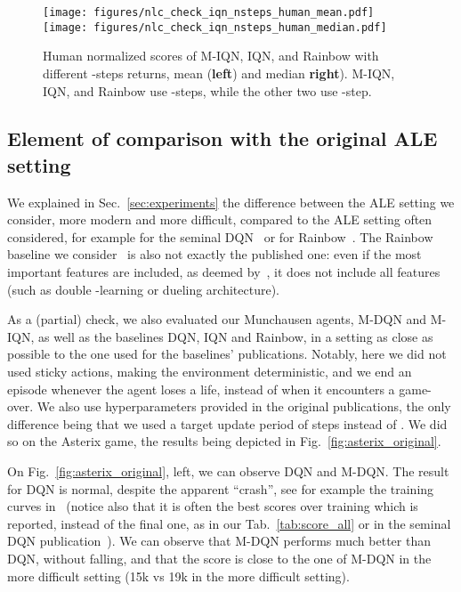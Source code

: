 \documentclass{article}
\begin{document}
\begin{figure}
    \centering
    \texttt{[image: figures/nlc\_check\_iqn\_nsteps\_human\_mean.pdf]}
    \texttt{[image: figures/nlc\_check\_iqn\_nsteps\_human\_median.pdf]}
    \caption{Human normalized scores of M-IQN, IQN, and Rainbow with different -steps returns, mean (\textbf{left}) and median \textbf{right}). M-IQN, IQN, and Rainbow use -steps, while the other two use -step.}
    \label{fig:n_steps}
\end{figure}

\subsection{Element of comparison with the original ALE setting}
\label{subappx:settings}

We explained in Sec.~\ref{sec:experiments} the difference between the ALE setting we consider, more modern and more difficult, compared to the ALE setting often considered, for example for the seminal DQN~\cite{mnih2015human} or for Rainbow~\cite{hessel2018rainbow}. The Rainbow baseline we consider~\cite{castro2018dopamine} is also not exactly the published one: even if the most important features are included, as deemed by~\citet{hessel2018rainbow}, it does not include all features (such as double -learning or dueling architecture).

As a (partial) check, we also evaluated our Munchausen agents, M-DQN and M-IQN, as well as the baselines DQN, IQN and Rainbow, in a setting as close as possible to the one used for the baselines' publications. Notably, here we did not used sticky actions, making the environment deterministic, and we end an episode whenever the agent loses a life, instead of when it encounters a game-over. We also use hyperparameters provided in the original publications, the only difference being that we used a target update period of  steps instead of . We did so on the Asterix game, the results being depicted in Fig.~\ref{fig:asterix_original}.

On Fig.~\ref{fig:asterix_original}, left, we can observe DQN and M-DQN. The result for DQN is normal, despite the apparent ``crash'', see for example the training curves in~\cite{hessel2018rainbow} (notice also that it is often the best scores over training which is reported, instead of the final one, as in our Tab.~\ref{tab:score_all} or in the seminal DQN publication~\cite{mnih2015human}). We can observe that M-DQN performs much better than DQN, without falling, and that the score is close to the one of M-DQN in the more difficult setting (15k vs 19k in the more difficult setting).
\end{document}
